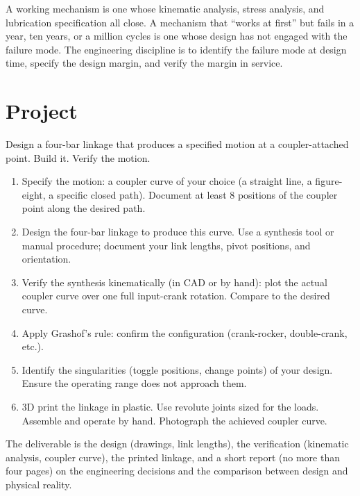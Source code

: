 \begin{principle}
A working mechanism is one whose kinematic analysis, stress analysis, and lubrication specification all close. A mechanism that ``works at first'' but fails in a year, ten years, or a million cycles is one whose design has not engaged with the failure mode. The engineering discipline is to identify the failure mode at design time, specify the design margin, and verify the margin in service.
\end{principle}

\section{Project}

\begin{project}
Design a four-bar linkage that produces a specified motion at a coupler-attached point. Build it. Verify the motion.

\begin{enumerate}[leftmargin=*]
  \item Specify the motion: a coupler curve of your choice (a straight line, a figure-eight, a specific closed path). Document at least 8 positions of the coupler point along the desired path.
  \item Design the four-bar linkage to produce this curve. Use a synthesis tool or manual procedure; document your link lengths, pivot positions, and orientation.
  \item Verify the synthesis kinematically (in CAD or by hand): plot the actual coupler curve over one full input-crank rotation. Compare to the desired curve.
  \item Apply Grashof's rule: confirm the configuration (crank-rocker, double-crank, etc.).
  \item Identify the singularities (toggle positions, change points) of your design. Ensure the operating range does not approach them.
  \item 3D print the linkage in plastic. Use revolute joints sized for the loads. Assemble and operate by hand. Photograph the achieved coupler curve.
\end{enumerate}

The deliverable is the design (drawings, link lengths), the verification (kinematic analysis, coupler curve), the printed linkage, and a short report (no more than four pages) on the engineering decisions and the comparison between design and physical reality.
\end{project}

